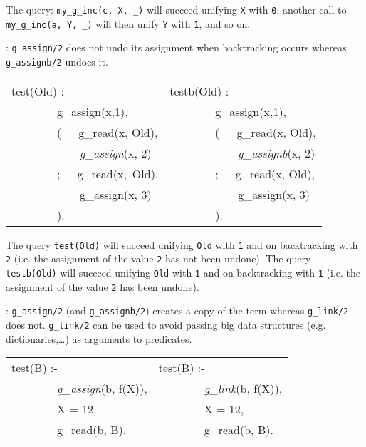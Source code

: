 The query: \texttt{my\_g\_inc(c, X, \_)} will succeed unifying \texttt{X} with
\texttt{0}, another call to \texttt{my\_g\_inc(a, Y, \_)} will then unify
\texttt{Y} with \texttt{1}, and so on.

:
\texttt{g\_assign/2} does not undo its assignment when backtracking occurs
whereas \texttt{g\_assignb/2} undoes it.

\begin{Code}
\begin{tabular}{@{}p{6cm}@{\quad}l@{}}
test(Old) :-                 & testb(Old) :- \\                  
~~~~~~~~g\_assign(x,1),      & ~~~~~~~~g\_assign(x,1), \\        
~~~~~~~~(~~~g\_read(x, Old), & ~~~~~~~~(~~~g\_read(x, Old), \\   
~~~~~~~~~~~~\textit{g\_assign}(x, 2)  & ~~~~~~~~~~~~\textit{g\_assignb}(x, 2) \\
~~~~~~~~;~~~g\_read(x,~Old), & ~~~~~~~~;~~~g\_read(x, Old), \\   
~~~~~~~~~~~~g\_assign(x, 3)  & ~~~~~~~~~~~~g\_assign(x, 3) \\    
~~~~~~~~).                   & ~~~~~~~~).                  \\
\end{tabular}
\end{Code}

The query \texttt{test(Old)} will succeed unifying \texttt{Old} with
\texttt{1} and on backtracking with \texttt{2} (i.e. the assignment of the
value \texttt{2} has not been undone). The query \texttt{testb(Old)} will
succeed unifying \texttt{Old} with \texttt{1} and on backtracking with
\texttt{1} (i.e. the assignment of the value \texttt{2} has been undone). 

:
\texttt{g\_assign/2} (and \texttt{g\_assignb/2}) creates a copy of the term
whereas \texttt{g\_link/2} does not. \texttt{g\_link/2} can be used to avoid
passing big data structures (e.g. dictionaries,\ldots) as arguments to
predicates.

\begin{Code}
\begin{tabular}{@{}p{6cm}@{\quad}l@{}}
test(B) :-                           & test(B) :-                \\
~~~~~~~~\textit{g\_assign}(b, f(X)), & ~~~~~~~~\textit{g\_link}(b, f(X)), \\ 
~~~~~~~~X = 12,                      & ~~~~~~~~X = 12,           \\
~~~~~~~~g\_read(b, B).               & ~~~~~~~~g\_read(b, B).    \\
\end{tabular}
\end{Code}

